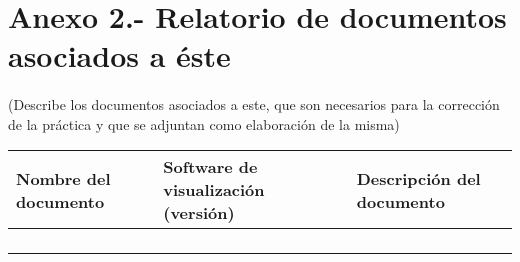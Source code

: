 \section{Anexo 2.- Relatorio de documentos asociados a éste}
\paragraph*{}
(Describe los documentos asociados a este, que son necesarios para la corrección de la práctica y que se adjuntan como elaboración de la misma)
\begin{table}[H]
  \centering
  \begin{tabular}{|P{4cm}|P{3cm}|P{6cm}|}
    \hline
    Nombre del documento & Software de visualización (versión) & Descripción del documento \\ \hline
    & & \\[1.5ex] \hline
    & & \\[1.5ex] \hline
    & & \\[1.5ex] \hline
    & & \\[1.5ex] \hline
  \end{tabular}
\end{table}